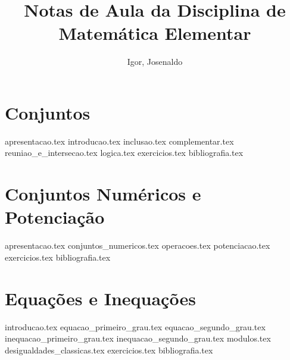 \documentclass[a4paper,12pt, oneside]{book}
\begin{document}
    \title{Notas de Aula da Disciplina de Matemática Elementar}
    \author{Igor, Josenaldo} %

    \frontmatter %
    \maketitle
    \tableofcontents

    \mainmatter %

    \chapter{Conjuntos}
    {apresentacao.tex}
    {introducao.tex}
    {inclusao.tex}
    {complementar.tex}
    {reuniao_e_intersecao.tex}
    {logica.tex}
    {exercicios.tex}
    {bibliografia.tex} %

    \chapter{Conjuntos Numéricos e Potenciação}    
    {apresentacao.tex}
    {conjuntos_numericos.tex}
    {operacoes.tex}
    {potenciacao.tex}
    {exercicios.tex}
    {bibliografia.tex} %

    \chapter{Equações e Inequações}
    {introducao.tex}
    {equacao_primeiro_grau.tex}
    {equacao_segundo_grau.tex}
    {inequacao_primeiro_grau.tex}
    {inequacao_segundo_grau.tex}
    {modulos.tex}
    {desigualdades_classicas.tex}
    {exercicios.tex}
    {bibliografia.tex} %
    
\end{document}
